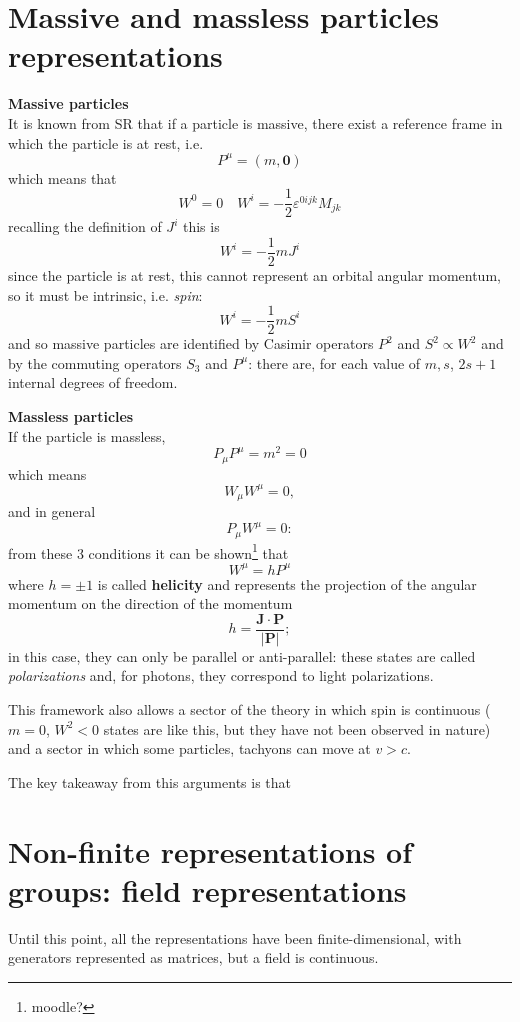 \section{Massive and massless particles representations}
\textbf{Massive particles}\\
It is known from SR that if a particle is massive, there exist a reference frame
in which the particle is at rest, i.e.
$$P^\mu = (m,\mathbf{0})$$
which means that
$$W^0 = 0\quad W^i = -\frac{1}{2} \varepsilon^{0ijk}M_{jk}$$
recalling the definition of $J^i$ this is
$$W^i = -\frac{1}{2}mJ^i$$
since the particle is at rest, this cannot represent an orbital angular momentum,
so it must be intrinsic, i.e. \textit{spin}:
$$W^i = -\frac{1}{2}mS^i$$
and so massive particles are identified by Casimir operators $P^2$ and $S^2\propto
W^2$ and by the commuting operators $S_3$ and $P^\mu$:
there are, for each value of $m,s$, $2s+1$ internal degrees of freedom.

\textbf{Massless particles}\\
If the particle is massless,
$$P_\mu P^\mu = m^2 = 0$$
which means
$$W_\mu W^\mu = 0,$$
and in general
$$P_\mu W^\mu = 0:$$
from these 3 conditions it can be shown\footnote{moodle?} that
$$W^\mu = h P^\mu$$
where $h = \pm 1$ is called \textbf{helicity} and represents the projection of the
angular momentum on the direction of the momentum
$$h = \frac{\mathbf{J}\cdot\mathbf{P}}{|\mathbf{P}|};$$
in this case, they can only be parallel or anti-parallel: these states are called
\textit{polarizations} and, for photons, they correspond to light polarizations.

This framework also allows a sector of the theory in which spin is continuous
($m=0$, $W^2<0$ states are like this, but they have not been observed in nature)
and a sector in which some particles, tachyons can move at $v>c$.

The key takeaway from this arguments is that

\noindent{}
\section{Non-finite representations of groups: field representations}
Until this point, all the representations have been finite-dimensional, with
generators represented as matrices, but a field is continuous.

